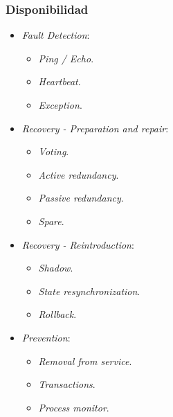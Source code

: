 \documentclass[]{article}
\begin{document}
\subsubsection{Disponibilidad}
\begin{itemize}
    \item \emph{Fault Detection}:
    \begin{itemize}
        \item \emph{Ping / Echo}.
        \item \emph{Heartbeat}.
        \item \emph{Exception}.
    \end{itemize}
    \item \emph{Recovery - Preparation and repair}:
    \begin{itemize}
        \item \emph{Voting}.
        \item \emph{Active redundancy}.
        \item \emph{Passive redundancy}.
        \item \emph{Spare}.
    \end{itemize}
    \item \emph{Recovery - Reintroduction}:
    \begin{itemize}
        \item \emph{Shadow}.
        \item \emph{State resynchronization}.
        \item \emph{Rollback}.
    \end{itemize}
    \item \emph{Prevention}:
    \begin{itemize}
        \item \emph{Removal from service}.
        \item \emph{Transactions}.
        \item \emph{Process monitor}.
    \end{itemize}
\end{itemize}
\end{document}
